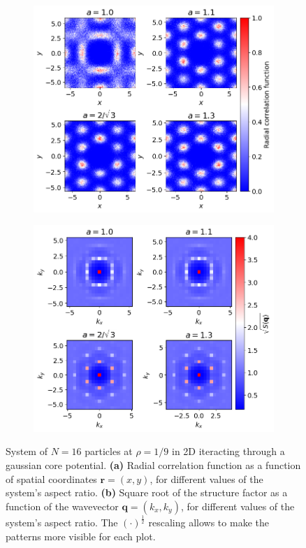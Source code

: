 \documentclass[a4paper, 12pt, oneside]{article}
\begin{document}
\begin{figure}
    \begin{subfigure}{0.5\textwidth}
        \centering
        \includegraphics[width=1.0\textwidth]{figures/pair_corr_func_xy_diff_a_2.png}
        \caption{\label{fig:corr_xy_diff_a}}
    \end{subfigure}
    \begin{subfigure}{0.5\textwidth}
        \centering
        \includegraphics[width=1.0\textwidth]{figures/structure_factor_diff_a.png}
        \caption{\label{fig:structure_factor_diff_a}}
    \end{subfigure}
    \caption{System of $N=16$ particles at $\rho=1/9$ in 2D iteracting through a gaussian core potential.
    \textbf{(a)} Radial correlation function as a function of spatial coordinates $\bm{r} = (x,y)$, for different 
    values of the system's aspect ratio. \textbf{(b)} Square root of the structure factor as a function of the 
    wavevector $\bm{q} = (k_x, k_y)$, for different values of the system's aspect ratio. The $(\cdot)^{\frac{1}{2}}$ 
    rescaling allows to make the patterns more visible for each plot.}
\end{figure}
\end{document}
